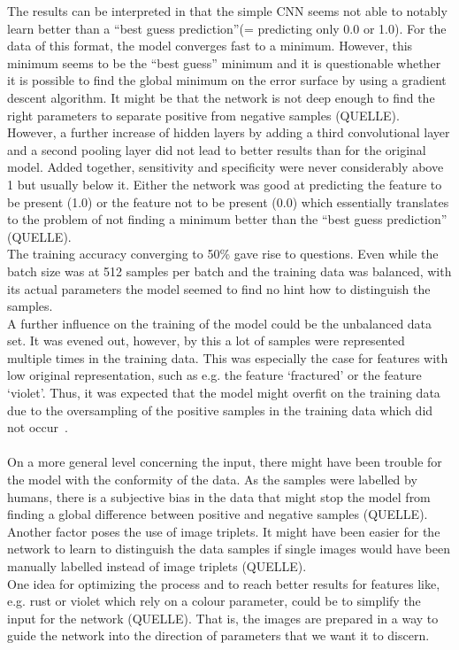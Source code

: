 The results can be interpreted in that the simple CNN seems not able to notably learn better than a “best guess prediction”(= predicting only 0.0 or 1.0).
For the data of this format, the model converges fast to a minimum. However, this minimum seems to be the “best guess” minimum and it is questionable whether it is possible to find the global minimum on the error surface by using a gradient descent algorithm. It might be that the network is not deep enough to find the right parameters to separate positive from negative samples (QUELLE). However, a further increase of hidden layers by adding a third convolutional layer and a second pooling layer did not lead to better results than for the original model. Added together, sensitivity and specificity were never considerably above 1 but usually below it. Either the network was good at predicting the feature to be present (1.0) or the feature not to be present (0.0) which essentially translates to the problem of not finding a minimum better than the “best guess prediction” (QUELLE). \\
The training accuracy converging to 50\% gave rise to questions. Even while the batch size was at 512 samples per batch and the training data was balanced, with its actual parameters the model seemed to find no hint how to distinguish the samples. \\
A further influence on the training of the model could be the unbalanced data set. It was evened out, however, by this a lot of samples were represented multiple times in the training data. This was especially the case for features with low original representation, such as e.g. the feature ‘fractured’ or the feature ‘violet’. Thus, it was expected that the model might overfit on the training data due to the oversampling of the positive samples in the training data which did not occur~\citep{he2009learning}. \\
\\
On a more general level concerning the input, there might have been trouble for the model with the conformity of the data. As the samples were labelled by humans, there is a subjective bias in the data that might stop the model from finding a global difference between positive and negative samples (QUELLE). \\
Another factor poses the use of image triplets. It might have been easier for the network to learn to distinguish the data samples if single images would have been manually labelled instead of image triplets (QUELLE). \\
One idea for optimizing the process and to reach better results for features like, e.g. rust or violet which rely on a colour parameter, could be to simplify the input for the network (QUELLE). That is, the images are prepared in a way to guide the network into the direction of parameters that we want it to discern. \\
